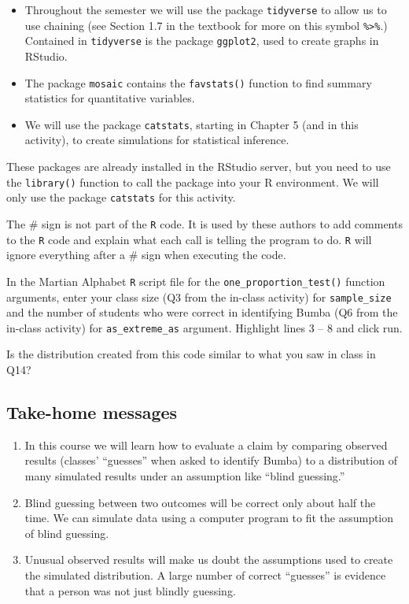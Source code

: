 \documentclass[
]{report}
\providecommand{\tightlist}{%
  \setlength{\itemsep}{0pt}\setlength{\parskip}{0pt}}
\begin{document}
\begin{itemize}
\tightlist
\item
  Throughout the semester we will use the package \texttt{tidyverse} to allow us to use chaining (see Section 1.7 in the textbook for more on this symbol \texttt{\%\textgreater{}\%}.) Contained in \texttt{tidyverse} is the package \texttt{ggplot2}, used to create graphs in RStudio.
\item
  The package \texttt{mosaic} contains the \texttt{favstats()} function to find summary statistics for quantitative variables.
\item
  We will use the package \texttt{catstats}, starting in Chapter 5 (and in this activity), to create simulations for statistical inference.
\end{itemize}

These packages are already installed in the RStudio server, but you need to use the \texttt{library()} function to call the package into your R environment. We will only use the package \texttt{catstats} for this activity.

The \# sign is not part of the \texttt{R} code.
It is used by these authors to add comments to the \texttt{R} code and explain what each call is telling the program to do.
\texttt{R} will ignore everything after a \# sign when executing the code.

In the Martian Alphabet \texttt{R} script file for the \texttt{one\_proportion\_test()} function arguments, enter your class size (Q3 from the in-class activity) for \texttt{sample\_size} and the number of students who were correct in identifying Bumba (Q6 from the in-class activity) for \texttt{as\_extreme\_as} argument. Highlight lines 3 -- 8 and click run.

Is the distribution created from this code similar to what you saw in class in Q14?

\vspace{0.3in}

\hypertarget{take-home-messages}{%
\subsection{Take-home messages}\label{take-home-messages}}

\begin{enumerate}
\def\labelenumi{\arabic{enumi}.}
\item
  In this course we will learn how to evaluate a claim by comparing observed results (classes' ``guesses'' when asked to identify Bumba) to a distribution of many simulated results under an assumption like ``blind guessing.''
\item
  Blind guessing between two outcomes will be correct only about half the time. We can simulate data using a computer program to fit the assumption of blind guessing.
\item
  Unusual observed results will make us doubt the assumptions used to create the simulated distribution. A large number of correct ``guesses'' is evidence that a person was not just blindly guessing.
\end{enumerate}
\end{document}
